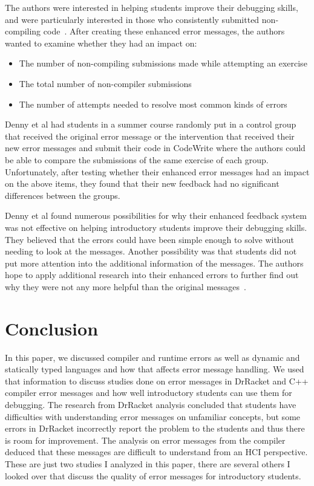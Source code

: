 \documentclass{sig-alternate}
\begin{document}
The authors were interested in helping students improve their debugging skills, and were particularly interested in those who consistently submitted non-compiling code~\cite{Denny:2014:ESE:2591708.2591748}.
After creating these enhanced error messages, the authors wanted to examine whether they had an impact on:
\begin{itemize}
	\item The number of non-compiling submissions made while attempting an exercise
	\item The total number of non-compiler submissions
	\item The number of attempts needed to resolve most common kinds of errors
\end{itemize}

Denny et al had students in a summer course randomly put in a control group that received the original error message or the intervention that received their new error messages and submit their code in CodeWrite where the authors could be able to compare the submissions of the same exercise of each group.
Unfortunately, after testing whether their enhanced error messages had an impact on the above items, they found that their new feedback had no significant differences between the groups.

Denny et al found numerous possibilities for why their enhanced feedback system was not effective on helping introductory students improve their debugging skills.
They believed that the errors could have been simple enough to solve without needing to look at the messages.
Another possibility was that students did not put more attention into the additional information of the messages.
The authors hope to apply additional research into their enhanced errors to further find out why they were not any more helpful than the original messages~\cite{Denny:2014:ESE:2591708.2591748}.


\section{Conclusion}\label{sec:concl}

In this paper, we discussed compiler and runtime errors as well as dynamic and statically typed languages and how that affects error message handling.
We used that information to discuss studies done on error messages in DrRacket and C++ compiler error messages and how well introductory students can use them for debugging.
The research from DrRacket analysis concluded that students have difficulties with understanding error messages on unfamiliar concepts, but some errors in DrRacket incorrectly report the problem to the students and thus there is room for improvement.
The analysis on error messages from the compiler deduced that these messages are difficult to understand from an HCI perspective.
These are just two studies I analyzed in this paper, there are several others I looked over that discuss the quality of error messages for introductory students.
\end{document}
